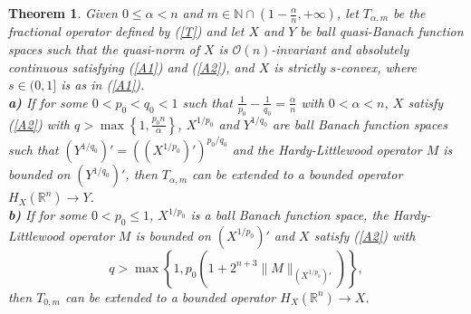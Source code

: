 \documentclass[oneside,10pt]{article}
\newtheorem{theorem}{Theorem}
\begin{document}
\begin{theorem} \label{main thm}
Given $0 \leq \alpha < n$ and $m \in \mathbb{N} \cap \left(1 - \frac{\alpha}{n}, +\infty \right)$, let $T_{\alpha, m}$ be the fractional operator defined by (\ref{T}) and let $X$ and $Y$ be ball quasi-Banach function spaces such that the quasi-norm of $X$ is $\mathcal{O}(n)$-invariant and absolutely continuous satisfying (\ref{A1}) and (\ref{A2}), and $X$ is strictly $s$-convex, where $s \in (0,1]$ is as in 
(\ref{A1}). 
\\
\textbf{a)} If for some $0 < p_0 < q_0 < 1$ such that $\frac{1}{p_0} - \frac{1}{q_0} = \frac{\alpha}{n}$ with $0 < \alpha < n$, $X$ 
satisfy (\ref{A2}) with $q > \max \left\{1, \frac{p_0 n}{\alpha} \right\}$, $X^{1/p_0}$ and $Y^{1/q_0}$ are ball Banach function spaces such that $(Y^{1/q_0})' = ((X^{1/p_0})')^{p_0/q_0}$ and the Hardy-Littlewood operator $M$ is bounded on $(Y^{1/q_0})'$,
then $T_{\alpha, m}$ can be extended to a bounded operator $H_X(\mathbb{R}^n) \to Y$.
\\
\textbf{b)} If for some $0 < p_0 \leq 1$, $X^{1/p_0}$ is a ball Banach function space, the Hardy-Littlewood operator $M$ is bounded on 
$(X^{1/p_0})'$ and $X$ satisfy (\ref{A2}) with 
\begin{equation} \label{qb}
q > \max \left\{1, p_0 \left(1+2^{n+3} \| M \|_{(X^{1/p_0})'} \right) \right\},
\end{equation}
then $T_{0, m}$ can be extended to a bounded operator $H_X(\mathbb{R}^n) \to X$.
\end{theorem}
\end{document}
